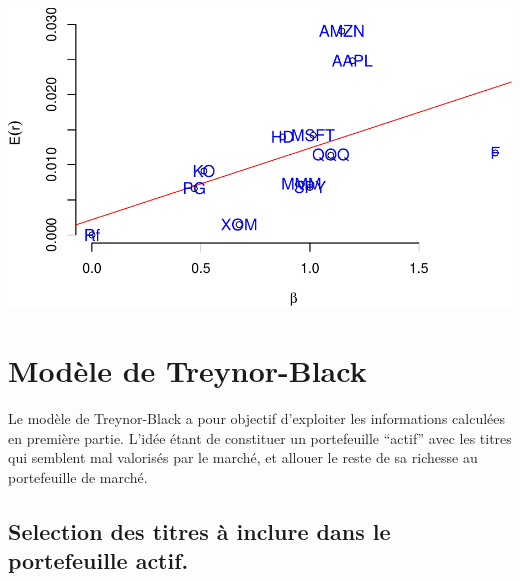 \documentclass[
]{article}
\begin{document}
\begin{table}[H]

\caption{\label{tab:unnamed-chunk-7}Alpha and Beta for each asset}
\centering
{}
\end{table}

\includegraphics{TP-Treynor_files/figure-latex/unnamed-chunk-8-1.pdf}

\hypertarget{moduxe8le-de-treynor-black}{%
\section{Modèle de Treynor-Black}\label{moduxe8le-de-treynor-black}}

Le modèle de Treynor-Black a pour objectif d'exploiter les informations
calculées en première partie. L'idée étant de constituer un portefeuille
``actif'' avec les titres qui semblent mal valorisés par le marché, et
allouer le reste de sa richesse au portefeuille de marché.

\hypertarget{selection-des-titres-uxe0-inclure-dans-le-portefeuille-actif.}{%
\subsection{Selection des titres à inclure dans le portefeuille
actif.}\label{selection-des-titres-uxe0-inclure-dans-le-portefeuille-actif.}}
\end{document}
